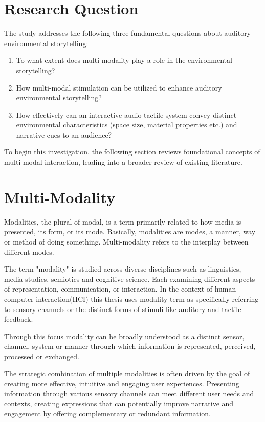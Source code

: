     \section{Research Question} 
    The study addresses the following three fundamental questions about auditory environmental storytelling:
    \begin{enumerate}
        \item To what extent does multi-modality play a role in the environmental storytelling?
        \item How multi-modal stimulation can be utilized to enhance auditory environmental storytelling?
        \item How effectively can an interactive audio-tactile system convey distinct environmental characteristics (space size, material properties etc.) and narrative cues to an audience?
    \end{enumerate}
    To begin this investigation, the following section reviews foundational concepts of multi-modal interaction, leading into a broader review of existing literature.
    \section{Multi-Modality} 
    Modalities, the plural of modal, is a term primarily related to how media is presented, its form, or its mode. Basically, modalities are modes, a manner, way or method of doing something. Multi-modality refers to the interplay between different modes\cite{Multimodal_Discourse}.\par 

    The term "modality" is studied across diverse disciplines such as linguistics, media studies, semiotics and cognitive science. Each examining different aspects of representation, communication, or interaction. In the context of human-computer interaction(HCI) this thesis uses modality term as specifically referring to sensory channels or the distinct forms of stimuli like auditory and tactile feedback.\par

    Through this focus modality can be broadly understood as a distinct sensor, channel, system or manner through which information is represented, perceived, processed or exchanged.\par

    The strategic combination of multiple modalities is often driven by the goal of creating more effective, intuitive and engaging user experiences. Presenting information through various sensory channels can meet different user needs and contexts, creating expressions that can potentially improve narrative and engagement by offering complementary or redundant information.\par

